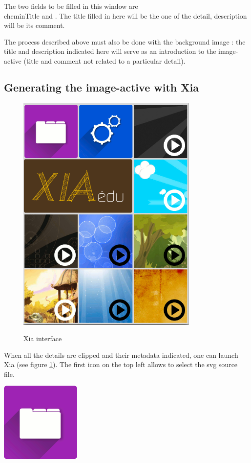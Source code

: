 {The two fields to be filled in this window are \\chemin{Title} and 
.  The title filled in here will be the one of the detail, 
description will be its comment.

The process described above must also be done with the background image : 
the title and description indicated here will serve as an introduction to 
the image-active (title and comment not related to a particular detail).

\subsection{Generating the image-active with Xia}

\begin{figure}[htp]
 \centering
 \caption{Xia interface}
 \includegraphics[width=0.8\textwidth]{./images/xia_vue_generale}
 \label{xia_interface}
\end{figure}

When all the details are clipped and their metadata indicated, one can launch 
Xia (see figure  \ref{xia_interface}). The first icon on the top left allows 
to select the svg source file.

\begin{center}
\includegraphics[scale=0.4]{./images/xia_open} 
\end{center}

}
